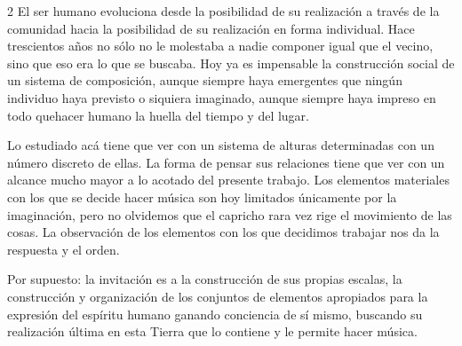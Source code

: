 \documentclass[a4paper,11pt]{article}
\begin{document}
\begin{multicols}{2}
El ser humano evoluciona desde la posibilidad de su realización a través de la comunidad hacia la posibilidad de su realización en forma individual. Hace trescientos años no sólo no le molestaba a nadie componer igual que el vecino, sino que eso era lo que se buscaba. Hoy ya es impensable la construcción social de un sistema de composición, aunque siempre haya emergentes que ningún individuo haya previsto o siquiera imaginado, aunque siempre haya impreso en todo quehacer humano la huella del tiempo y del lugar.

Lo estudiado acá tiene que ver con un sistema de alturas determinadas con un número discreto de ellas. La forma de pensar sus relaciones tiene que ver con un alcance mucho mayor a lo acotado del presente trabajo. Los elementos materiales con los que se decide hacer música son hoy limitados únicamente por la imaginación, pero no olvidemos que el capricho rara vez rige el movimiento de las cosas. La observación de los elementos con los que decidimos trabajar nos da la respuesta y el orden.

Por supuesto: la invitación es a la construcción de sus propias escalas, la construcción y organización de los conjuntos de elementos apropiados para la expresión del espíritu humano ganando conciencia de sí mismo, buscando su realización última en esta Tierra que lo contiene y le permite hacer música.
\end{multicols}
\newpage
\listoffigures
\listoftables
\end{document}
